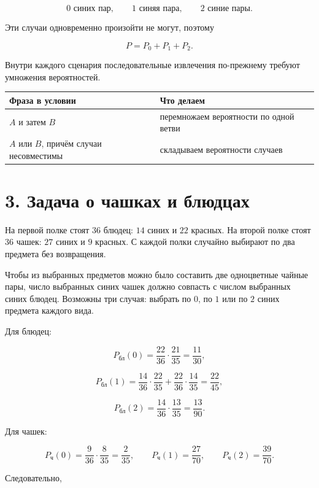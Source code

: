 \documentclass[a4paper,12pt]{article}
\begin{document}
\[
0\text{ синих пар},\qquad 1\text{ синяя пара},\qquad 2\text{ синие пары}.
\]

Эти случаи одновременно произойти не могут, поэтому

\[
P=P_0+P_1+P_2.
\]

Внутри каждого сценария последовательные извлечения по-прежнему требуют умножения вероятностей.

\begin{center}
\renewcommand{\arraystretch}{1.3}
\begin{tabularx}{0.9\linewidth}{@{}lX@{}}
\toprule
\textbf{Фраза в условии} & \textbf{Что делаем} \\
\midrule
$A$ и затем $B$ & перемножаем вероятности по одной ветви \\
$A$ или $B$, причём случаи несовместимы & складываем вероятности случаев \\
\bottomrule
\end{tabularx}
\end{center}

\section*{3. Задача о чашках и блюдцах}

На первой полке стоят $36$ блюдец: $14$ синих и $22$ красных. На второй полке стоят $36$ чашек: $27$ синих и $9$ красных. С каждой полки случайно выбирают по два предмета без возвращения.

Чтобы из выбранных предметов можно было составить две одноцветные чайные пары, число выбранных синих чашек должно совпасть с числом выбранных синих блюдец. Возможны три случая: выбрать по $0$, по $1$ или по $2$ синих предмета каждого вида.

Для блюдец:

\[
P_{\text{бл}}(0)
=
\frac{22}{36}\cdot\frac{21}{35}
=
\frac{11}{30},
\]

\[
P_{\text{бл}}(1)
=
\frac{14}{36}\cdot\frac{22}{35}
+
\frac{22}{36}\cdot\frac{14}{35}
=
\frac{22}{45},
\]

\[
P_{\text{бл}}(2)
=
\frac{14}{36}\cdot\frac{13}{35}
=
\frac{13}{90}.
\]

Для чашек:

\[
P_{\text{ч}}(0)=\frac{9}{36}\cdot\frac{8}{35}=\frac{2}{35},
\qquad
P_{\text{ч}}(1)=\frac{27}{70},
\qquad
P_{\text{ч}}(2)=\frac{39}{70}.
\]

Следовательно,
\end{document}
